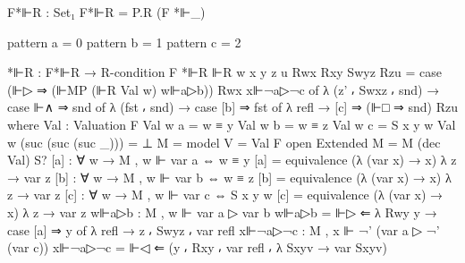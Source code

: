 \begin{spverbatim}
  F*⊩R : Set₁
  F*⊩R = P.R (F *⊩_)

  pattern a = 0
  pattern b = 1
  pattern c = 2

  *⊩R : F*⊩R → R-condition F
  *⊩R ⊩R {w} {x} {y} {z} {u} Rwx Rxy Swyz Rzu = case (⊩▷ ⇒ (⊩MP (⊩R Val w) w⊩a▷b)) Rwx x⊩¬a▷¬c of
    λ { (z' ⸴ Swxz ⸴ snd) → case ⊩∧ ⇒ snd of
    λ { (fst ⸴ snd) → case [b] ⇒ fst of λ {refl → [c] ⇒ (⊩□ ⇒ snd) Rzu}}}
    where
    Val : Valuation F
    Val w a = w ≡ y
    Val w b = w ≡ z
    Val w c = S x y w
    Val w (suc (suc (suc _))) = ⊥
    M = model {V = Val} F
    open Extended {M = M} (dec Val) S?
    [a] : ∀ {w} → M , w ⊩ var a ⇔ w ≡ y
    [a] = equivalence (λ { (var x) → x}) λ {z → var z}
    [b] : ∀ {w} → M , w ⊩ var b ⇔ w ≡ z
    [b] = equivalence (λ { (var x) → x}) λ {z → var z}
    [c] : ∀ {w} → M , w ⊩ var c ⇔ S x y w
    [c] = equivalence (λ { (var x) → x}) λ {z → var z}
    w⊩a▷b : M , w ⊩ var a  ▷ var b
    w⊩a▷b = ⊩▷ ⇐ λ { Rwy y → case [a] ⇒ y of λ {refl → z ⸴ Swyz ⸴ var refl}}
    x⊩¬a▷¬c : M , x ⊩ ¬' (var a ▷ ¬' (var c))
    x⊩¬a▷¬c = ⊩◁ ⇐ (y ⸴ Rxy ⸴ var refl ⸴ λ { Sxyv → var Sxyv})
\end{spverbatim}

